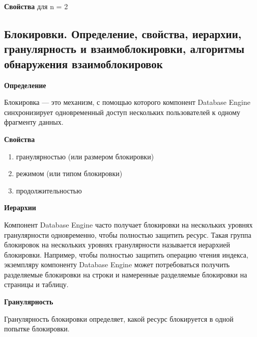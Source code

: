 \textbf{Свойства} для n = 2


\subsection{Блокировки. Определение, свойства, иерархии, гранулярность и взаимоблокировки, алгоритмы обнаружения взаимоблокировок}

\textbf{Определение}

Блокировка --- это механизм, с помощью которого компонент Database Engine
синхронизирует одновременный доступ нескольких пользователей к одному фрагменту данных.

\textbf{Свойства}

\begin{enumerate}
	\item гранулярностью (или размером блокировки)
	\item режимом (или типом блокировки)
	\item продолжительностью
\end{enumerate}

\textbf{Иерархии}

Компонент Database Engine часто получает блокировки на нескольких уровнях гранулярности одновременно, чтобы полностью защитить ресурс. Такая группа блокировок на нескольких уровнях гранулярности называется иерархией блокировки. Например, чтобы полностью защитить операцию чтения индекса, экземпляру компоненту Database Engine может потребоваться получить разделяемые блокировки на строки и намеренные разделяемые блокировки на страницы и таблицу.

\textbf{Гранулярность}

Гранулярность блокировки определяет, какой ресурс блокируется в одной попытке блокировки.

